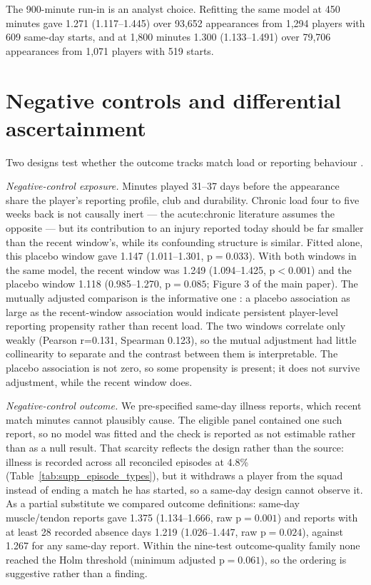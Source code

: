 \documentclass[11pt]{article}
\newcommand{\pval}{\mathrm{p}}
\begin{document}
The 900-minute run-in is an analyst choice. Refitting the same model at 450 minutes gave 1.271 (1.117--1.445) over 93,652 appearances from 1,294 players with 609 same-day starts, and at 1,800 minutes 1.300 (1.133--1.491) over 79,706 appearances from 1,071 players with 519 starts.

\section{Negative controls and differential ascertainment}

Two designs test whether the outcome tracks match load or reporting behaviour \cite{lipsitch2010_negative_controls,sanderson2018_negative_control_measurement_error}.

\emph{Negative-control exposure.} Minutes played 31--37 days before the appearance share the player's reporting profile, club and durability. Chronic load four to five weeks back is not causally inert --- the acute:chronic literature assumes the opposite \cite{impellizzeri2020acwr_pitfalls,wang2020acwr_lessons} --- but its contribution to an injury reported today should be far smaller than the recent window's, while its confounding structure is similar. Fitted alone, this placebo window gave 1.147 (1.011--1.301, $\pval=0.033$). With both windows in the same model, the recent window was 1.249 (1.094--1.425, $\pval<0.001$) and the placebo window 1.118 (0.985--1.270, $\pval=0.085$; Figure 3 of the main paper). The mutually adjusted comparison is the informative one \cite{madley_dowd2020_negative_control_mutual_adjustment}: a placebo association as large as the recent-window association would indicate persistent player-level reporting propensity rather than recent load. The two windows correlate only weakly (Pearson r=0.131, Spearman 0.123), so the mutual adjustment had little collinearity to separate and the contrast between them is interpretable. The placebo association is not zero, so some propensity is present; it does not survive adjustment, while the recent window does.


\emph{Negative-control outcome.} We pre-specified same-day illness reports, which recent match minutes cannot plausibly cause. The eligible panel contained one such report, so no model was fitted and the check is reported as not estimable rather than as a null result. That scarcity reflects the design rather than the source: illness is recorded across all reconciled episodes at 4.8\% (Table~\ref{tab:supp_episode_types}), but it withdraws a player from the squad instead of ending a match he has started, so a same-day design cannot observe it. As a partial substitute we compared outcome definitions: same-day muscle/tendon reports gave 1.375 (1.134--1.666, raw $\pval=0.001$) and reports with at least 28 recorded absence days 1.219 (1.026--1.447, raw $\pval=0.024$), against 1.267 for any same-day report. Within the nine-test outcome-quality family none reached the Holm threshold (minimum adjusted $\pval=0.061$), so the ordering is suggestive rather than a finding.
\end{document}

